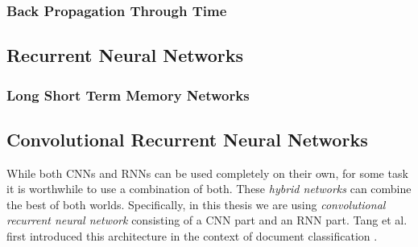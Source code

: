 \subsubsection{Back Propagation Through Time}

\subsection{Recurrent Neural Networks}
\subsubsection{Long Short Term Memory Networks}

\subsection{Convolutional Recurrent Neural Networks}
\label{sec:hybrid_networks}
While both CNNs and RNNs can be used completely on their own, for some task it is worthwhile to use a combination of both. These \emph{hybrid networks} can combine the best of both worlds. Specifically, in this thesis we are using \emph{convolutional recurrent neural network} consisting of a CNN part and an RNN part. Tang et al. first introduced this architecture in the context of document classification \cite{tang2015document}.

